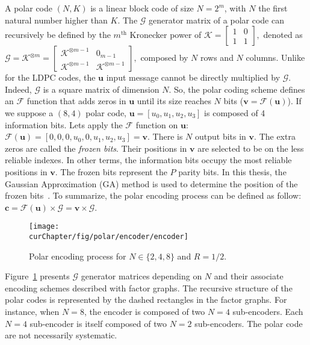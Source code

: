 A polar code $(N,K)$ is a linear block code of size $N = 2^m$, with $N$ the
first natural number higher than $K$. The $\bm{\mathcal{G}}$ generator matrix of
a polar code can recursively be defined by the $m^\text{th}$ Kronecker power of
$\bm{\mathcal{K}} =
\begin{bmatrix}
1 & 0 \\
1 & 1
\end{bmatrix},$
denoted as
$
\bm{\mathcal{G}} = \bm{\mathcal{K}}^{\otimes m} =
\begin{bmatrix}
\bm{\mathcal{K}}^{\otimes m-1} & 0_{m -1} \\
\bm{\mathcal{K}}^{\otimes m-1} & \bm{\mathcal{K}}^{\otimes m-1}
\end{bmatrix},
$
composed by $N$ rows and $N$ columns. Unlike for the LDPC codes, the $\bm{u}$
input message cannot be directly multiplied by $\bm{\mathcal{G}}$. Indeed,
$\bm{\mathcal{G}}$ is a square matrix of dimension $N$. So, the polar coding
scheme defines an $\mathcal{F}$ function that adds zeros in $\bm{u}$ until its
size reaches $N$ bits ($\bm{v} = \mathcal{F}(\bm{u})$). If we suppose a $(8,4)$
polar code, $\bm{u} = [u_0, u_1, u_2, u_3]$ is composed of 4 information bits.
Lets apply the $\mathcal{F}$ function on $\bm{u}$: $\mathcal{F}(\bm{u}) =
[0, 0, 0, u_0, 0, u_1, u_2, u_3] = \bm{v}$. There is $N$ output bits in
$\bm{v}$. The extra zeros are called the \emph{frozen bits}. Their positions in
$\bm{v}$ are selected to be on the less reliable indexes. In other terms, the
information bits occupy the most reliable positions in $\bm{v}$. The frozen bits
represent the $P$ parity bits. In this thesis, the Gaussian Approximation (GA)
method is used to determine the position of the frozen bits~\cite{Trifonov2012}.
To summarize, the polar encoding process can be defined as follow: $\bm{c} =
\mathcal{F}(\bm{u}) \times \bm{\mathcal{G}} = \bm{v} \times \bm{\mathcal{G}}$.

\begin{figure}[htp]
  \centering
  \texttt{[image: \\curChapter/fig/polar/encoder/encoder]}
  \caption{Polar encoding process for $N \in \{2, 4, 8\}$ and $R = 1/2$.}
  \label{fig:ctx_polar_encoder}
\end{figure}

\newpage
Figure~\ref{fig:ctx_polar_encoder} presents $\bm{\mathcal{G}}$ generator
matrices depending on $N$ and their associate encoding schemes described with
factor graphs. The recursive structure of the polar codes is represented by the
dashed rectangles in the factor graphs. For instance, when $N = 8$, the encoder
is composed of two $N = 4$ sub-encoders. Each $N = 4$ sub-encoder is itself
composed of two $N = 2$ sub-encoders. The polar code are not necessarily
systematic.

